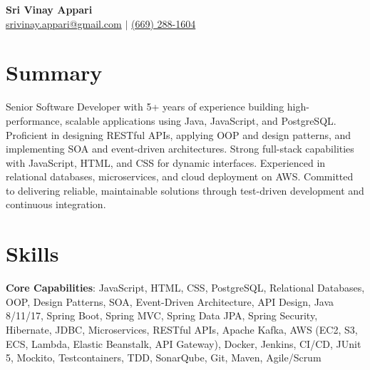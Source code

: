 \documentclass{resume}
\begin{document}
\begin{center}
    {\Huge \textbf{Sri Vinay Appari}}\\[4pt]
    \small
    \href{mailto:srivinay.appari@gmail.com}{srivinay.appari@gmail.com} $|$
    \href{tel:(669) 288-1604}{(669) 288-1604}
\end{center}

\section{Summary}
\begin{itemize}[leftmargin=0pt, itemindent=0pt, labelwidth=0pt, labelsep=0pt, align=left, label={}]%
  \small{\item{
    Senior Software Developer with 5+ years of experience building high-performance, scalable applications using Java, JavaScript, and PostgreSQL. Proficient in designing RESTful APIs, applying OOP and design patterns, and implementing SOA and event-driven architectures. Strong full-stack capabilities with JavaScript, HTML, and CSS for dynamic interfaces. Experienced in relational databases, microservices, and cloud deployment on AWS. Committed to delivering reliable, maintainable solutions through test-driven development and continuous integration.
  }}
\end{itemize}

\section{Skills}
\begin{itemize}[leftmargin=0pt, itemindent=0pt, labelwidth=0pt, labelsep=0pt, align=left, label={}]%
  \small{\item{
    \textbf{Core Capabilities}{: JavaScript, HTML, CSS, PostgreSQL, Relational Databases, OOP, Design Patterns, SOA, Event-Driven Architecture, API Design, Java 8/11/17, Spring Boot, Spring MVC, Spring Data JPA, Spring Security, Hibernate, JDBC, Microservices, RESTful APIs, Apache Kafka, AWS (EC2, S3, ECS, Lambda, Elastic Beanstalk, API Gateway), Docker, Jenkins, CI/CD, JUnit 5, Mockito, Testcontainers, TDD, SonarQube, Git, Maven, Agile/Scrum}
  }}
\end{itemize}

\end{document}
